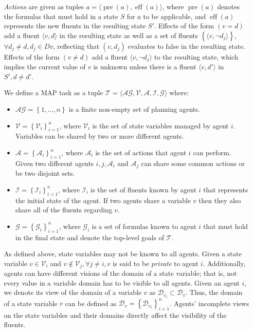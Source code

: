 \documentclass[12pt]{article}
\DeclareMathOperator{\pre}{pre}
\DeclareMathOperator{\eff}{eff}
\begin{document}
\textit{Actions} are given as tuples $a = \langle \pre(a),\eff(a)\rangle$, where $\pre(a)$ denotes the formulas that must hold in a state $S$ for $a$ to be applicable, and $\eff(a)$ represents the new fluents in the resulting state $S'$. Effects of the form $(v = d)$ add a fluent $\langle v,d\rangle$ in the resulting state as well as a set of fluents $\left\{ \langle v,\neg d_j\rangle \right\}$, $\forall d_j \neq d, d_j \in Dv$, reflecting that $(v, d_j)$ evaluates to false in the resulting state. Effects of the form $(v \neq d)$ add a fluent $\langle v,\neg d_j\rangle$ to the resulting state, which implies the current value of $v$ is unknown unless there is a fluent $\langle v,d'\rangle$ in $S', d \neq d'$.

We define a MAP task as a tuple $\mathcal{T} = \langle \mathcal{AG}, \mathcal{V}, \mathcal{A}, \mathcal{I}, \mathcal{G} \rangle$ where:
\begin{itemize}
  \item $\mathcal{AG} = \left\{1, \ldots, n\right\}$ is a finite non-empty set of planning agents.
  \item $\mathcal{V} = \left\{\mathcal{V}_i\right\}^n_{i=1}$, where $\mathcal{V}_i$ is the set of state variables managed by agent $i$. Variables can be shared by two or more different agents.
  \item $\mathcal{A} = \left\{\mathcal{A}_i\right\}^n_{i=1}$, where $\mathcal{A}_i$ is the set of actions that agent $i$ can perform. Given two different agents $i, j, \mathcal{A}_i$ and $\mathcal{A}_j$ can share some common actions or be two disjoint sets.
  \item $\mathcal{I} = \left\{\mathcal{I}_i\right\}^n_{i=1}$, where $\mathcal{I}_i$ is the set of fluents known by agent $i$ that represents the initial state of the agent. If two agents share a variable $v$ then they also share all of the fluents regarding $v$.
  \item $\mathcal{G} = \left\{\mathcal{G}_i\right\}^n_{i=1}$, where $\mathcal{G}_i$ is a set of formulas known to agent $i$ that must hold in the final state and denote the top-level goals of $\mathcal{T}$.
\end{itemize}

As defined above, state variables may not be known to all agents. Given a state variable $v \in \mathcal{V}_i$ and $v \notin \mathcal{V}_j, \forall j \neq i, v$ is said to be \textit{private} to agent $i$. Additionally, agents can have different visions of the domain of a state variable; that is, not every value in a variable domain has to be visible to all agents. Given an agent $i$, we denote its view of the domain of a variable $v$ as $\mathcal{D}_{v_i} \subset \mathcal{D}_v$. Thus, the domain of a state variable $v$ can be defined as $\mathcal{D}_v = \left\{\mathcal{D}_{v_i}\right\}^n_{i=1}$. Agents’ incomplete views on the state variables and their domains directly affect the visibility of the fluents.
\end{document}
